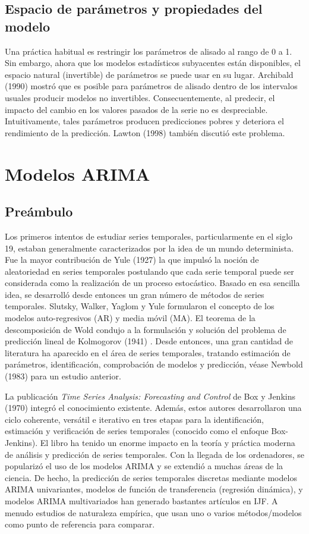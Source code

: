 \documentclass{llncs}
\begin{document}
\subsection{Espacio de parámetros y propiedades del modelo}
Una práctica habitual es restringir los parámetros de alisado al rango de 0 a 1. Sin embargo, ahora que los modelos estadísticos subyacentes están disponibles, el espacio natural (invertible) de parámetros se puede usar en su lugar. Archibald (1990) \cite{Archibald1990199} mostró que es posible para parámetros de alisado dentro de los intervalos usuales producir modelos no invertibles. Consecuentemente, al predecir, el impacto del cambio en los valores pasados de la serie no es despreciable. Intuitivamente, tales parámetros producen predicciones pobres y deteriora el rendimiento de la predicción. Lawton (1998) \cite{Lawton1998393} también discutió este problema.

\section{Modelos ARIMA}
\subsection{Preámbulo}
Los primeros intentos de estudiar series temporales, particularmente en el siglo 19, estaban generalmente caracterizados por la idea de un mundo determinista. Fue la mayor contribución de Yule (1927) \cite{Yule1927267} la que impulsó la noción de aleatoriedad en series temporales postulando que cada serie temporal puede ser considerada como la realización de un proceso estocástico. Basado en esa sencilla idea, se desarrolló desde entonces un gran número de métodos de series temporales. Slutsky, Walker, Yaglom y Yule formularon el concepto de los modelos auto-regresivos (AR) y media móvil (MA). El teorema de la descomposición de Wold condujo a la formulación y solución del problema de predicción lineal de Kolmogorov (1941) \cite{Kolmogorov19411}. Desde entonces, una gran cantidad de literatura ha aparecido en el área de series temporales, tratando estimación de parámetros, identificación, comprobación de modelos y predicción, véase Newbold (1983) \cite{Newbold198323} para un estudio anterior.

La publicación \emph{Time Series Analysis: Forecasting and Control} de Box y Jenkins (1970) \cite{Box1976} integró el conocimiento existente. Además, estos autores desarrollaron una ciclo coherente, versátil e iterativo en tres etapas para la identificación, estimación y verificación de series temporales (conocido como el enfoque Box-Jenkins). El libro ha tenido un enorme impacto en la teoría y práctica moderna de análisis y predicción de series temporales. Con la llegada de los ordenadores, se popularizó el uso de los modelos ARIMA y se extendió a muchas áreas de la ciencia. De hecho, la predicción de series temporales discretas mediante modelos ARIMA univariantes, modelos de función de transferencia (regresión dinámica), y modelos ARIMA multivariados han generado bastantes artículos en IJF. A menudo estudios de naturaleza empírica, que usan uno o varios métodos/modelos como punto de referencia para comparar. 
\end{document}
